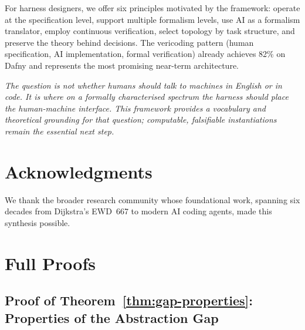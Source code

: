 \documentclass[11pt, a4paper, logo, copyright]{googledeepmind}
\begin{document}
For harness designers, we offer six principles motivated by the framework: operate at the specification level, support multiple formalism levels, use AI as a formalism translator, employ continuous verification, select topology by task structure, and preserve the theory behind decisions. The vericoding pattern (human specification, AI implementation, formal verification) already achieves 82\% on Dafny and represents the most promising near-term architecture.

\emph{The question is not whether humans should talk to machines in English or in code. It is where on a formally characterised spectrum the harness should place the human-machine interface. This framework provides a vocabulary and theoretical grounding for that question; computable, falsifiable instantiations remain the essential next step.}


\section*{Acknowledgments}

We thank the broader research community whose foundational work, spanning six decades from Dijkstra's EWD~667 to modern AI coding agents, made this synthesis possible.









\clearpage


\appendix

\section{Full Proofs}
\label{app:proofs}

\subsection{Proof of Theorem~\ref{thm:gap-properties}: Properties of the Abstraction Gap}
\end{document}
